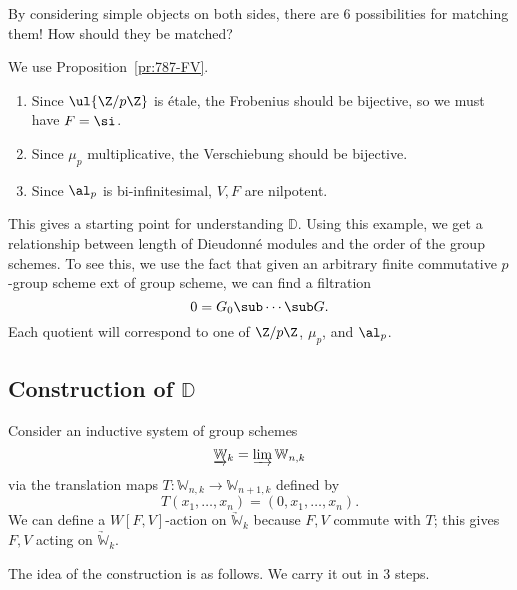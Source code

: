 By considering simple objects on both sides, there are 6 possibilities for matching them! How should they be matched?

We use Proposition~\ref{pr:787-FV}. 
\begin{enumerate}
\item
Since $\ul{\Z/p\Z}$ is \'etale, the Frobenius should be bijective, so we must have $F=\si$.
\item
Since $\mu_p$ multiplicative, the Verschiebung should be bijective.
\item
Since $\al_p$ is bi-infinitesimal, $V,F$ are nilpotent.
\end{enumerate}
 
This gives a starting point for understanding $\mathbb D$. Using this example, we get a relationship between length of Dieudonn\'e modules and the order of the group schemes. To see this, we use the fact that given an arbitrary finite commutative $p$-group scheme ext of group scheme, we can find a filtration 
\[
0=G_0\sub\cdots \sub G.
\]
Each quotient will correspond to one of $\Z/p\Z$, $\mu_p$, and $\al_p$. 

\subsection{Construction of $\mathbb D$}
\begin{df}
Consider an inductive system of group schemes
\[
\underrightarrow{\mathbb W}_k=\varinjlim \mathbb W_{n,k}
\]
via the translation maps $T: \mathbb W_{n,k}\to  \mathbb W_{n+1,k}$ defined by 
\[
T(x_1,\ldots, x_n)=(0,x_1,\ldots, x_n).
\]
We can define a $W[F,V]$-action on $ \underrightarrow{\mathbb W}_k$ because $F,V$ commute with $T$; this gives $F,V$ acting on $\underrightarrow{\mathbb W}_k$.
\end{df}

The idea of the construction is as follows. We carry it out in 3 steps.

